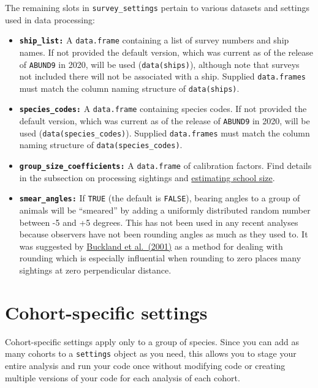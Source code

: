 \documentclass[
]{book}
\begin{document}
The remaining slots in \texttt{survey\_settings} pertain to various datasets and settings used in data processing:

\begin{itemize}
\item
  \textbf{\texttt{ship\_list:}} A \texttt{data.frame} containing a list of survey numbers and ship names. If not provided the default version, which was current as of the release of \texttt{ABUND9} in 2020, will be used (\texttt{data(ships)}), although note that surveys not included there will not be associated with a ship. Supplied \texttt{data.frames} must match the column naming structure of \texttt{data(ships)}.
\item
  \textbf{\texttt{species\_codes:}} A \texttt{data.frame} containing species codes. If not provided the default version, which was current as of the release of \texttt{ABUND9} in 2020, will be used (\texttt{data(species\_codes)}). Supplied \texttt{data.frames} must match the column naming structure of \texttt{data(species\_codes)}.
\item
  \textbf{\texttt{group\_size\_coefficients:}} A \texttt{data.frame} of calibration factors. Find details in the subsection on processing sightings and \protect\hyperlink{ss_calibration}{estimating school size}.
\item
  \textbf{\texttt{smear\_angles:}} If \texttt{TRUE} (the default is \texttt{FALSE}), bearing angles to a group of animals will be ``smeared'' by adding a uniformly distributed random number between -5 and +5 degrees. This has not been used in any recent analyses because observers have not been rounding angles as much as they used to. It was suggested by \href{https://distancesampling.org/whatisds.html\#books}{Buckland et al.~(2001)} as a method for dealing with rounding which is especially influential when rounding to zero places many sightings at zero perpendicular distance.
\end{itemize}

\hypertarget{cohort-specific-settings}{%
\section*{Cohort-specific settings}\label{cohort-specific-settings}}

Cohort-specific settings apply only to a group of species. Since you can add as many cohorts to a \texttt{settings} object as you need, this allows you to stage your entire analysis and run your code once without modifying code or creating multiple versions of your code for each analysis of each cohort.
\end{document}
